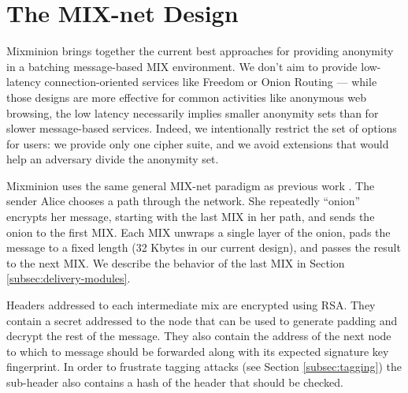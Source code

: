 \documentclass{llncs}
\begin{document}

\section{The MIX-net Design}
\label{sec:design}

Mixminion brings together the current best approaches for providing
anonymity in a batching message-based MIX environment. We don't aim
to provide low-latency connection-oriented services like Freedom
\cite{freedom} or Onion Routing \cite{goldschlag99} --- while those
designs are more effective for common activities like anonymous web
browsing, the low latency necessarily implies smaller anonymity sets
than for slower message-based services. Indeed, we intentionally
restrict the set of options for users: we provide only one
cipher suite, and we avoid extensions that would help an adversary
divide the anonymity set.

Mixminion uses the same general MIX-net paradigm as previous work
\cite{chaum-mix,mixmaster-attacks,babel}. The sender Alice chooses a
path through the network. She repeatedly ``onion'' encrypts her message,
starting with the last
MIX in her path, and sends the onion to the first MIX. Each
MIX unwraps a single layer of the onion, pads the message to a fixed
length (32 Kbytes in our current design), and passes the result to the
next MIX. We describe the behavior of the last MIX in
Section \ref{subsec:delivery-modules}.


Headers addressed to each intermediate mix are encrypted using RSA.
They contain a secret addressed
to the node that can be used to generate padding and decrypt the rest
of the message. They also contain the address of the next node to 
which to message should be forwarded along with its expected signature 
key fingerprint. In order to frustrate tagging attacks (see
Section \ref{subsec:tagging}) the sub-header also contains a hash of
the header that
should be checked. 

\end{document}
